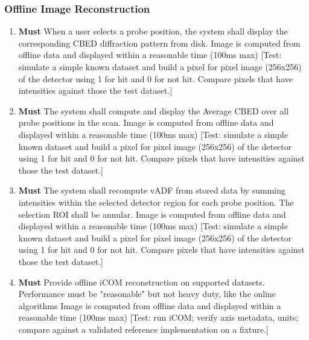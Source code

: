 \documentclass[10pt]{article}
\newcommand{\PriorityTag}[2]{%
  \colorbox{#2!25}{\footnotesize\textsf{\textbf{#1}}}\hspace{0.6em}}
\newcommand{\must}{\leavevmode\PriorityTag{Must}{green}}
\newcounter{reqgrp}[section] %
\newcounter{reqno}
\newcommand{\reqprefix}{GEN}
\newenvironment{requirements}[1]{%
  \renewcommand{\reqprefix}{#1}%
  \refstepcounter{reqgrp}%
  \setcounter{reqno}{0}%
  \begin{enumerate}[leftmargin=*]
}{\end{enumerate}}
\begin{document}
\subsubsection{Offline Image Reconstruction}
\begin{requirements}{OFR}

\item \must {}
  {When a user selects a probe position, the system shall display the corresponding CBED diffraction pattern from disk.}
  {Image is computed from offline data and displayed within a reasonable time (100ms max)}
  [Test: simulate a simple known dataset and build a pixel for pixel image (256x256) of the detector using 1 for hit and 0 for not hit. Compare pixels that have intensities against those the test dataset.]

\item \must {}
  {The system shall compute and display the Average CBED over all probe positions in the scan.}
  {Image is computed from offline data and displayed within a reasonable time (100ms max)}
  [Test: simulate a simple known dataset and build a pixel for pixel image (256x256) of the detector using 1 for hit and 0 for not hit. Compare pixels that have intensities against those the test dataset.]

\item \must {}
  {The system shall recompute vADF from stored data by summing intensities within the selected detector region for each probe position. The selection ROI shall be annular.}
  {Image is computed from offline data and displayed within a reasonable time (100ms max)}
  [Test: simulate a simple known dataset and build a pixel for pixel image (256x256) of the detector using 1 for hit and 0 for not hit. Compare pixels that have intensities against those the test dataset.]

\item \must {}
  {Provide offline iCOM reconstruction on supported datasets. Performance must be "reasonable" but not heavy duty, like the online algorithms}
  {Image is computed from offline data and displayed within a reasonable time (100ms max)}
  [Test: run iCOM; verify axis metadata, units; compare against a validated reference implementation on a fixture.]


\end{requirements}
\end{document}
